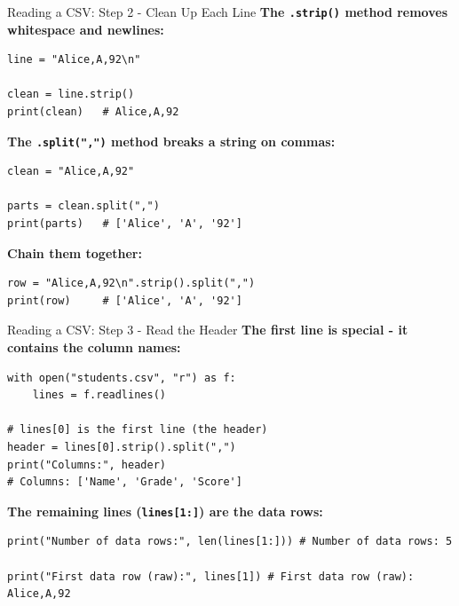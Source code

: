 \documentclass{csbeamer}
\begin{document}
\begin{frame}[fragile]{Reading a CSV: Step 2 - Clean Up Each Line}
    \textbf{The \texttt{.strip()} method removes whitespace and newlines:}

    \begin{lstlisting}
line = "Alice,A,92\n"

clean = line.strip()
print(clean)   # Alice,A,92
    \end{lstlisting}

    \vspace{0.5em}
    \pause

    \textbf{The \texttt{.split(",")} method breaks a string on commas:}

    \begin{lstlisting}
clean = "Alice,A,92"

parts = clean.split(",")
print(parts)   # ['Alice', 'A', '92']
    \end{lstlisting}

    \vspace{0.5em}
    \pause

    \textbf{Chain them together:}

    \begin{lstlisting}
row = "Alice,A,92\n".strip().split(",")
print(row)     # ['Alice', 'A', '92']
    \end{lstlisting}
\end{frame}

\begin{frame}[fragile]{Reading a CSV: Step 3 - Read the Header}
    \textbf{The \textcolor{stfxblue}{first line} is special - it contains the column names:}

    \begin{lstlisting}
with open("students.csv", "r") as f:
    lines = f.readlines()

# lines[0] is the first line (the header)
header = lines[0].strip().split(",")
print("Columns:", header)
# Columns: ['Name', 'Grade', 'Score']
    \end{lstlisting}

    \pause

    \textbf{The remaining lines (\texttt{lines[1:]}) are the data rows:}

    \begin{lstlisting}
print("Number of data rows:", len(lines[1:])) # Number of data rows: 5

print("First data row (raw):", lines[1]) # First data row (raw): Alice,A,92
    \end{lstlisting}

\end{frame}
\end{document}
